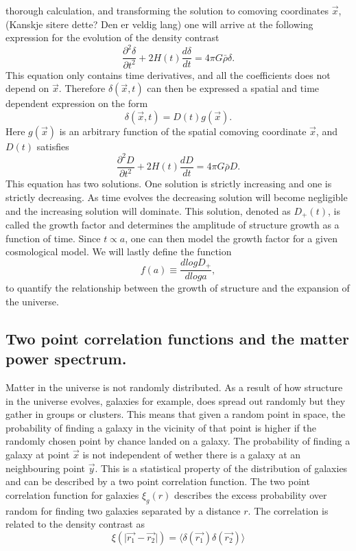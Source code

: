 thorough calculation, and transforming the solution to comoving coordinates $\vec{x}$, (Kanskje sitere dette? Den er veldig lang) one will arrive at the following expression for the
evolution of the density contrast
\begin{equation}
    \frac{\partial^2 \delta}{\partial t^2} + 2H(t) \frac{d \delta}{dt}=4\pi G\bar{\rho}\delta.
\end{equation}
This equation only contains time derivatives, and all the coefficients does not
depend on $\vec{x}$. Therefore $\delta(\vec{x}, t)$ can then be expressed a spatial and time
dependent expression on the form 
\begin{equation}
    \delta(\vec{x}, t) = D(t)g(\vec{x}).
\end{equation}
Here $g(\vec{x})$ is an arbitrary function of the spatial comoving coordinate
$\vec{x}$, and $D(t)$ satisfies
\begin{equation}
    \frac{\partial^2 D}{\partial t^2} + 2H(t) \frac{d D}{dt}=4\pi G\bar{\rho}D.
\end{equation}
This equation has two solutions. One solution is strictly increasing and one is
strictly decreasing. As time evolves the decreasing solution will become negligible
and the increasing solution will dominate. This solution, denoted as $D_+(t)$,
is called the growth factor and determines the amplitude of structure growth as
a function of time. Since $t\propto a$, one can then model the growth factor for
a given cosmological model. We will lastly define the function
\begin{equation}
    f(a) \equiv \frac{d log D_+}{d log a},
\end{equation}
to quantify the relationship between the growth of structure and the expansion
of the universe.

\subsection{Two point correlation functions and the matter power spectrum.}
Matter in the universe is not randomly distributed. As a result of how structure in the universe evolves, galaxies for example,
does spread out randomly but they gather in groups or clusters. This means that given a random point in space, the probability of finding
a galaxy in the vicinity of that point is higher if the randomly chosen point by chance landed on a galaxy. The probability of finding a galaxy
at point $\vec{x}$ is not independent of wether there is a galaxy at an neighbouring point $\vec{y}$. This is a statistical property of the distribution
of galaxies and can be described by a two point correlation function. The two point correlation function for galaxies $\xi_{g}(r)$ describes the excess probability
over random for finding two galaxies separated by a distance $r$. The correlation is related to the density contrast as
\begin{equation}
    \xi(\vert\vec{r_1}-\vec{r_2}\vert)=\langle\delta(\vec{r_1})\delta(\vec{r_2})\rangle
\end{equation}
\\

